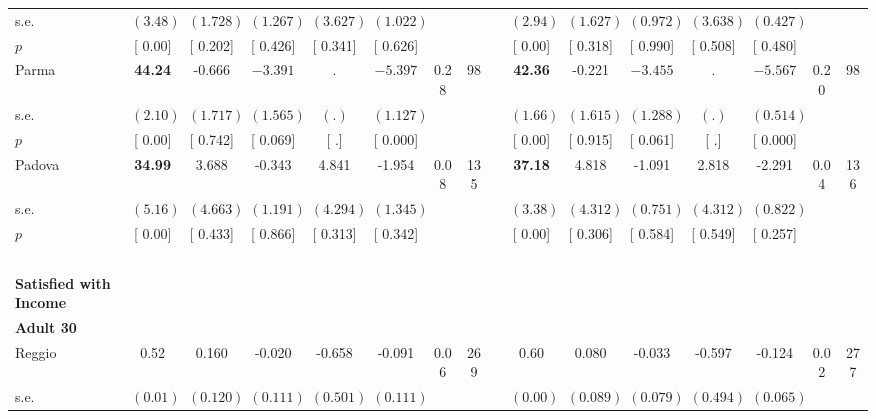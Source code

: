 \begin{longtable}{L{8em} c c c c c c c p{1em} c c c c c c c}
\quad \quad \quad \quad s.e.& $ (     3.48)$ & $ (    1.728)$ & $ (    1.267)$ & $ (    3.627)$ & $ (    1.022)$ & & & & $ (     2.94)$ & $ (    1.627)$ & $ (    0.972)$ & $ (    3.638)$ & $ (    0.427)$ & &  \\*
\quad \quad \quad \quad $ p$ & [     0.00] & [    0.202] & [    0.426] & [    0.341] & [    0.626] & & & & [     0.00] & [    0.318] & [    0.990] & [    0.508] & [    0.480] & &  \\[1em]
\quad \quad \quad Parma& \textbf{    44.24} &    -0.666 & $ \mathbf{   -3.391}$ &         . & $ \mathbf{   -5.397}$ &      0.28 &        98 & & \textbf{    42.36} &    -0.221 & $ \mathbf{   -3.455}$ &         . & $ \mathbf{   -5.567}$ &      0.20 &        98  \\*
\quad \quad \quad \quad s.e.& $ (     2.10)$ & $ (    1.717)$ & $ (    1.565)$ & $ (        .)$ & $ (    1.127)$ & & & & $ (     1.66)$ & $ (    1.615)$ & $ (    1.288)$ & $ (        .)$ & $ (    0.514)$ & &  \\*
\quad \quad \quad \quad $ p$ & [     0.00] & [    0.742] & [    0.069] & [        .] & [    0.000] & & & & [     0.00] & [    0.915] & [    0.061] & [        .] & [    0.000] & &  \\[1em]
\quad \quad \quad Padova& \textbf{    34.99} &     3.688 &    -0.343 &     4.841 &    -1.954 &      0.08 &       135 & & \textbf{    37.18} &     4.818 &    -1.091 &     2.818 &    -2.291 &      0.04 &       136  \\*
\quad \quad \quad \quad s.e.& $ (     5.16)$ & $ (    4.663)$ & $ (    1.191)$ & $ (    4.294)$ & $ (    1.345)$ & & & & $ (     3.38)$ & $ (    4.312)$ & $ (    0.751)$ & $ (    4.312)$ & $ (    0.822)$ & &  \\*
\quad \quad \quad \quad $ p$ & [     0.00] & [    0.433] & [    0.866] & [    0.313] & [    0.342] & & & & [     0.00] & [    0.306] & [    0.584] & [    0.549] & [    0.257] & &  \\[1em]
~\\[1em]
\textbf{Satisfied with Income} \\*
\quad \quad \textbf{Adult 30} & & & & & & & & & & & & & & & \\* 
\quad \quad \quad Reggio& 0.52 &     0.160 &    -0.020 &    -0.658 &    -0.091 &      0.06 &       269 & & 0.60 &     0.080 &    -0.033 &    -0.597 &    -0.124 &      0.02 &       277  \\*
\quad \quad \quad \quad s.e.& $ (     0.01)$ & $ (    0.120)$ & $ (    0.111)$ & $ (    0.501)$ & $ (    0.111)$ & & & & $ (     0.00)$ & $ (    0.089)$ & $ (    0.079)$ & $ (    0.494)$ & $ (    0.065)$ & &  \\*

\end{longtable}
